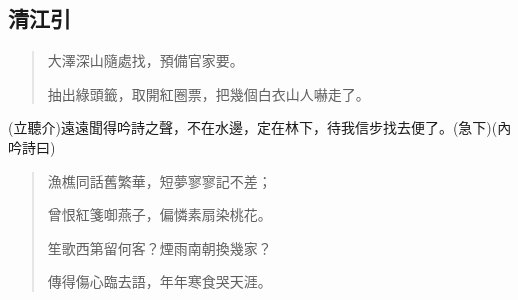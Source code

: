 \documentclass[UTF8]{ctexart}
\begin{document}
\subsection{清江引}

\begin{verse}
    大澤深山隨處找，預備官家要。
    
    抽出綠頭籤，取開紅圈票，把幾個白衣山人嚇走了。
\end{verse}

(立聽介)遠遠聞得吟詩之聲，不在水邊，定在林下，待我信步找去便了。(急下)(內吟詩曰)

\begin{verse}
    漁樵同話舊繁華，短夢寥寥記不差；

    曾恨紅箋啣燕子，偏憐素扇染桃花。

    笙歌西第留何客？煙雨南朝換幾家？

    傳得傷心臨去語，年年寒食哭天涯。
\end{verse}
\end{document}
